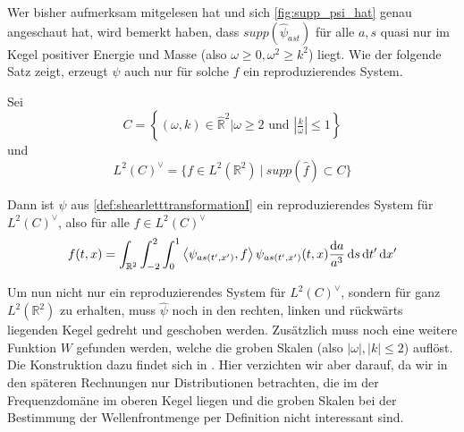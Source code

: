 Wer bisher aufmerksam mitgelesen hat und sich \cref{fig:supp_psi_hat} genau angeschaut hat, wird bemerkt haben, dass $supp(\hat\psi_{ast})$ für alle $a,s$ quasi nur im Kegel positiver Energie und Masse (also $\omega \geq 0, \omega^2 \geq k^2$) liegt. Wie der folgende Satz zeigt, erzeugt $\psi$ auch nur für solche $f$ ein reproduzierendes System.

\begin{theorem}
    Sei
    \begin{equation}
        C= \left\{(\omega,k)\in \hat{\mathbb{R}}^2
        \Big| \omega \geq 2 \textrm{ und } \left\lvert\tfrac{k}{\omega}\right\rvert \leq 1
        \right\}
    \end{equation}
    und
    \begin{equation}
        L^2(C)^\vee = \{f \in L^2(\mathbb{R}^2) ~|~ supp (\hat f) \subset C\}
    \end{equation}

    Dann ist $\psi$ aus \cref{def:shearletttransformationI} ein reproduzierendes System für $L^2(C)^\vee$, also für alle
    $f \in L^2(C)^\vee$
    \begin{equation}
        f(t,x) = \int_{\mathbb{R}^2} \int_{-2}^2 \int_0^1
                \left\langle\psi_{as(t',x')},f\right\rangle \psi_{as(t',x')}(t,x)
                \frac{\mathop{}\!\mathrm{d} a}{a^3} \mathop{}\!\mathrm{d} s \mathop{}\!\mathrm{d} t' \mathop{}\!\mathrm{d} x'
    \end{equation}
\end{theorem}

Um nun nicht nur ein reproduzierendes System für $L^2(C)^\vee$, sondern für ganz $L^2(\mathbb{R}^2)$ zu erhalten, muss $\hat \psi$ noch in den rechten, linken und rückwärts liegenden Kegel gedreht und geschoben werden. Zusätzlich muss noch eine weitere Funktion $W$ gefunden werden, welche die groben Skalen (also $|\omega|, |k| \leq 2$) auflöst. Die Konstruktion dazu findet sich in \textcite[pp. 7]{Kutyniok2008}. Hier verzichten wir aber darauf, da wir in den späteren Rechnungen nur Distributionen betrachten, die im der Frequenzdomäne im oberen Kegel liegen und die groben Skalen bei der Bestimmung der Wellenfrontmenge per Definition nicht interessant sind.



